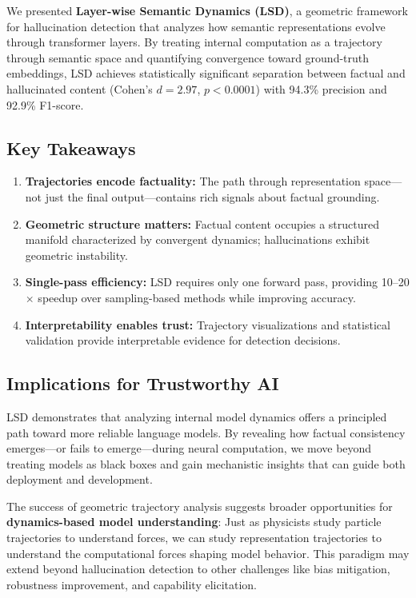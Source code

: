 \documentclass[11pt]{article}
\begin{document}
We presented \textbf{Layer-wise Semantic Dynamics (LSD)}, a geometric framework for hallucination detection that analyzes how semantic representations evolve through transformer layers. By treating internal computation as a trajectory through semantic space and quantifying convergence toward ground-truth embeddings, LSD achieves statistically significant separation between factual and hallucinated content (Cohen's $d = 2.97$, $p < 0.0001$) with 94.3\% precision and 92.9\% F1-score.

\subsection{Key Takeaways}

\begin{enumerate}[leftmargin=*]
    \item \textbf{Trajectories encode factuality:} The path through representation space—not just the final output—contains rich signals about factual grounding.
    
    \item \textbf{Geometric structure matters:} Factual content occupies a structured manifold characterized by convergent dynamics; hallucinations exhibit geometric instability.
    
    \item \textbf{Single-pass efficiency:} LSD requires only one forward pass, providing 10--20$\times$ speedup over sampling-based methods while improving accuracy.
    
    \item \textbf{Interpretability enables trust:} Trajectory visualizations and statistical validation provide interpretable evidence for detection decisions.
\end{enumerate}

\subsection{Implications for Trustworthy AI}

LSD demonstrates that analyzing internal model dynamics offers a principled path toward more reliable language models. By revealing how factual consistency emerges—or fails to emerge—during neural computation, we move beyond treating models as black boxes and gain mechanistic insights that can guide both deployment and development.

The success of geometric trajectory analysis suggests broader opportunities for \textbf{dynamics-based model understanding}: Just as physicists study particle trajectories to understand forces, we can study representation trajectories to understand the computational forces shaping model behavior. This paradigm may extend beyond hallucination detection to other challenges like bias mitigation, robustness improvement, and capability elicitation.
\end{document}
